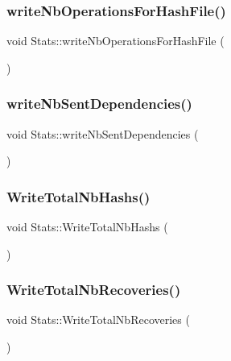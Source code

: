 \subsubsection{\texorpdfstring{write\+Nb\+Operations\+For\+Hash\+File()}{writeNbOperationsForHashFile()}}
{\footnotesize\ttfamily void Stats\+::write\+Nb\+Operations\+For\+Hash\+File (\begin{DoxyParamCaption}{ }\end{DoxyParamCaption})\hspace{0.3cm}{\ttfamily [private]}}

\mbox{\label{classStats_a5e7dc3debec2bdc35b11e713283ab0b3}} 
\subsubsection{\texorpdfstring{write\+Nb\+Sent\+Dependencies()}{writeNbSentDependencies()}}
{\footnotesize\ttfamily void Stats\+::write\+Nb\+Sent\+Dependencies (\begin{DoxyParamCaption}{ }\end{DoxyParamCaption})\hspace{0.3cm}{\ttfamily [private]}}

\mbox{\label{classStats_a89cedfe36937b0f9a5f525a8858e54f2}} 
\subsubsection{\texorpdfstring{Write\+Total\+Nb\+Hashs()}{WriteTotalNbHashs()}}
{\footnotesize\ttfamily void Stats\+::\+Write\+Total\+Nb\+Hashs (\begin{DoxyParamCaption}{ }\end{DoxyParamCaption})\hspace{0.3cm}{\ttfamily [private]}}

\mbox{\label{classStats_a75689d1481b0605ce74d775e36c21740}} 
\subsubsection{\texorpdfstring{Write\+Total\+Nb\+Recoveries()}{WriteTotalNbRecoveries()}}
{\footnotesize\ttfamily void Stats\+::\+Write\+Total\+Nb\+Recoveries (\begin{DoxyParamCaption}{ }\end{DoxyParamCaption})\hspace{0.3cm}{\ttfamily [private]}}

